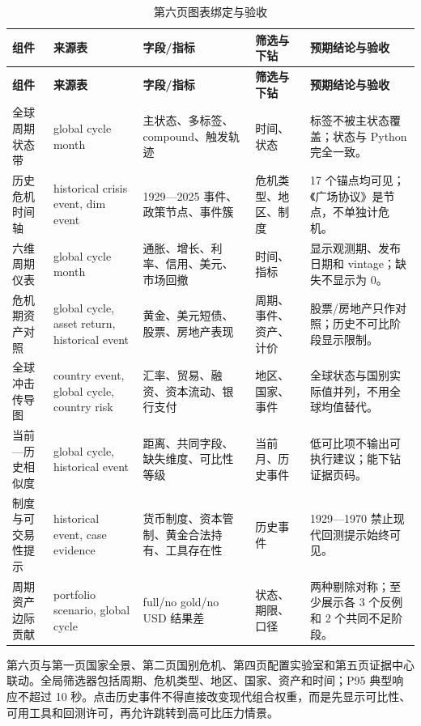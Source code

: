 \documentclass[UTF8,fontset=windows,12pt,openany]{ctexbook}
\begin{document}
\clearpage
\begin{landscape}
\begin{longtable}{p{3.3cm}p{3.6cm}p{4.4cm}p{3.1cm}p{4.5cm}}
\caption{第六页图表绑定与验收}\label{tab:page6-map}\\
\toprule
\textbf{组件} & \textbf{来源表} & \textbf{字段/指标} & \textbf{筛选与下钻} & \textbf{预期结论与验收}\\
\midrule
\endfirsthead
\toprule \textbf{组件} & \textbf{来源表} & \textbf{字段/指标} & \textbf{筛选与下钻} & \textbf{预期结论与验收}\\ \midrule
\endhead
全球周期状态带 & global cycle month & 主状态、多标签、compound、触发轨迹 & 时间、状态 & 标签不被主状态覆盖；状态与 Python 完全一致。\\
历史危机时间轴 & historical crisis event, dim event & 1929—2025 事件、政策节点、事件簇 & 危机类型、地区、制度 & 17 个锚点均可见；《广场协议》是节点，不单独计危机。\\
六维周期仪表 & global cycle month & 通胀、增长、利率、信用、美元、市场回撤 & 时间、指标 & 显示观测期、发布日期和 vintage；缺失不显示为 0。\\
危机期资产对照 & global cycle, asset return, historical event & 黄金、美元短债、股票、房地产表现 & 周期、事件、资产、计价 & 股票/房地产只作对照；历史不可比阶段显示限制。\\
全球冲击传导图 & country event, global cycle, country risk & 汇率、贸易、融资、资本流动、银行支付 & 地区、国家、事件 & 全球状态与国别实际值并列，不用全球均值替代。\\
当前—历史相似度 & global cycle, historical event & 距离、共同字段、缺失维度、可比性等级 & 当前月、历史事件 & 低可比项不输出可执行建议；能下钻证据页码。\\
制度与可交易性提示 & historical event, case evidence & 货币制度、资本管制、黄金合法持有、工具存在性 & 历史事件 & 1929—1970 禁止现代回测提示始终可见。\\
周期资产边际贡献 & portfolio scenario, global cycle & full/no gold/no USD 结果差 & 状态、期限、口径 & 两种剔除对称；至少展示各 3 个反例和 2 个共同不足阶段。\\
\bottomrule
\end{longtable}
\end{landscape}

第六页与第一页国家全景、第二页国别危机、第四页配置实验室和第五页证据中心联动。全局筛选器包括周期、危机类型、地区、国家、资产和时间；P95 典型响应不超过 10 秒。点击历史事件不得直接改变现代组合权重，而是先显示可比性、可用工具和回测许可，再允许跳转到高可比压力情景。
\end{document}
